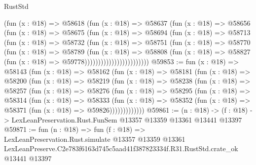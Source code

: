 \begin{lexlean}{RustStd}
\begin{coremodule}
                          (fun (x : @18) =>
                          @58618
                            (fun (x : @18) =>
                            @58637
                              (fun (x : @18) =>
                              @58656
                                (fun (x : @18) =>
                                @58675
                                  (fun (x : @18) =>
                                  @58694
                                    (fun (x : @18) =>
                                    @58713
                                      (fun (x : @18) =>
                                      @58732
                                        (fun (x : @18) =>
                                        @58751
                                          (fun (x : @18) =>
                                          @58770
                                            (fun (x : @18) =>
                                            @58789
                                              (fun (x : @18) =>
                                              @58808
                                                (fun (x : @18) =>
                                                @58827
                                                  (fun (x : @18) => @59778))))))))))))))))))))))))
@59853 := fun (x : @18) =>
  @58143
    (fun (x : @18) =>
    @58162
      (fun (x : @18) =>
      @58181
        (fun (x : @18) =>
        @58200
          (fun (x : @18) =>
          @58219
            (fun (x : @18) =>
            @58238
              (fun (x : @18) =>
              @58257
                (fun (x : @18) =>
                @58276
                  (fun (x : @18) =>
                  @58295
                    (fun (x : @18) =>
                    @58314
                      (fun (x : @18) =>
                      @58333
                        (fun (x : @18) =>
                        @58352 (fun (x : @18) => @58371 (fun (x : @18) => @59826)))))))))))))
@59861 := (n : @18) ->
  (f : @18) -> LexLeanPreservation.Rust.FunSem @13357 @13359 @13361 @13441 @13397
@59871 := fun (n : @18) =>
  fun (f : @18) =>
  LexLeanPreservation.Rust.simulate
    @13357
    @13359
    @13361
    LexLeanPreserve.C2e783f6163d745c5aad41f387823334f.R31.RustStd.crate_ok
    @13441
    @13397
\end{coremodule}
\end{lexlean}
